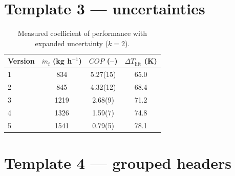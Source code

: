 \documentclass[11pt,a4paper]{article}
\begin{document}
\clearpage
%
\section*{Template 3 --- uncertainties}

\begin{table}[!htb]
  \centering
  \caption{Measured coefficient of performance with expanded uncertainty
           ($k = 2$).}
  \label{tab:uncertainty}
  \begin{tabular}{l
                  S[table-format=4.0]
                  S[table-format=1.2(2)]
                  S[table-format=2.1]}
    \toprule
    Version & {$\dot{m}_\mathrm{f}$ (kg h$^{-1}$)}
            & {$COP$ (--)}
            & {$\Delta T_\mathrm{lift}$ (K)} \\
     &  834 & 5.27(15) & 65.0 \\
    2 &  845 & 4.32(12) & 68.4 \\
    3 & 1219 & 2.68(9)  & 71.2 \\
    4 & 1326 & 1.59(7)  & 74.8 \\
    5 & 1541 & 0.79(5)  & 78.1 \\
    \bottomrule
  \end{tabular}
\end{table}

%
\section*{Template 4 --- grouped headers}
\end{document}
